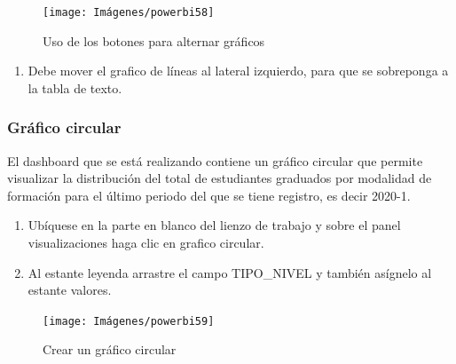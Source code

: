\documentclass[
]{book}
\providecommand{\tightlist}{%
  \setlength{\itemsep}{0pt}\setlength{\parskip}{0pt}}
\begin{document}
\begin{figure}

{\centering \texttt{[image: Imágenes/powerbi58]} 

}

\caption{Uso de los botones para alternar gráficos}\label{fig:paso13alternancia-fig}
\end{figure}

\begin{enumerate}
\def\labelenumi{\arabic{enumi}.}
\setcounter{enumi}{13}
\tightlist
\item
  Debe mover el grafico de líneas al lateral izquierdo, para que se sobreponga a la tabla de texto.
\end{enumerate}

\hypertarget{gruxe1fico-circular}{%
\subsubsection{Gráfico circular}\label{gruxe1fico-circular}}

El dashboard que se está realizando contiene un gráfico circular que permite visualizar la distribución del total de estudiantes graduados por modalidad de formación para el último periodo del que se tiene registro, es decir 2020-1.

\begin{enumerate}
\def\labelenumi{\arabic{enumi}.}
\item
  Ubíquese en la parte en blanco del lienzo de trabajo y sobre el panel visualizaciones haga clic en grafico circular.
\item
  Al estante leyenda arrastre el campo TIPO\_NIVEL y también asígnelo al estante valores.
\end{enumerate}

\begin{figure}

{\centering \texttt{[image: Imágenes/powerbi59]} 

}

\caption{Crear un gráfico circular}\label{fig:paso2circular-fig}
\end{figure}
\end{document}
